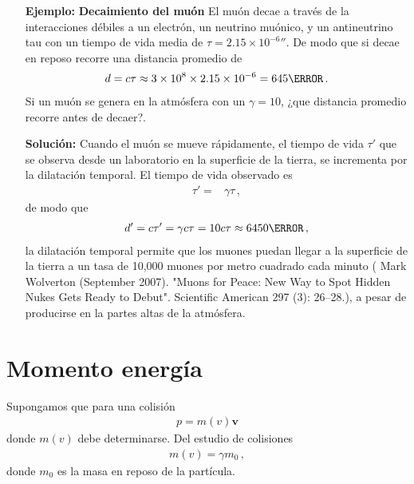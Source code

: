 \begin{itemize}
\item[\textbf{Ejemplo:}] \textbf{Decaimiento del muón} El muón decae a través de la interacciones débiles a un electrón, un neutrino muónico, y un antineutrino tau con un tiempo de vida media de $\tau=2.15\times 10^{-6}\second$. De modo que si decae en reposo recorre una distancia promedio de
  \begin{align*}
    d=c\tau\approx 3\times 10^8\times 2.15\times 10^{-6}=645\meter\,. 
  \end{align*}
Si un muón se genera en la atmósfera con un $\gamma=10$, ¿que distancia promedio recorre antes de decaer?.
\item[\textbf{Solución:}] Cuando el muón se mueve rápidamente, el tiempo de vida $\tau'$ que se observa desde un laboratorio en la superficie de la tierra, se incrementa por la dilatación temporal. El tiempo de vida observado es
  \begin{align*}
    \tau'=&\gamma\tau\,,
  \end{align*}
de modo que
\begin{align*}
  d'=c\tau'=\gamma c\tau=10 c\tau\approx 6450\meter\,,
\end{align*}
la dilatación temporal permite que los muones puedan llegar a la superficie de la tierra a un tasa de 10,000 muones por metro cuadrado cada minuto ( Mark Wolverton (September 2007). "Muons for Peace: New Way to Spot Hidden Nukes Gets Ready to Debut". Scientific American 297 (3): 26–28.), a pesar de producirse en la partes altas de la atmósfera.
\end{itemize}

\section{Momento energía}
Supongamos que para una colisión
\begin{align*}
  p=m(v)\mathbf{v}
\end{align*}
donde $m(v)$ debe determinarse. Del estudio de colisiones
\begin{align*}
  m(v)=\gamma m_0\,,
\end{align*}
donde $m_0$ es la masa en reposo de la partícula.

